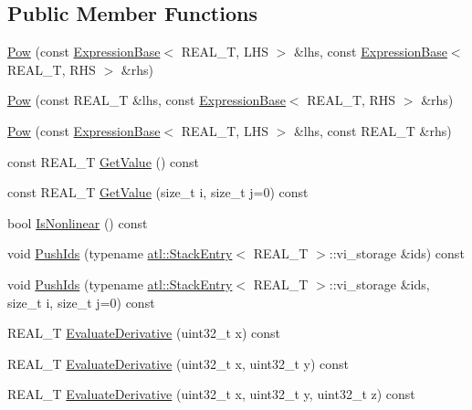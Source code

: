 \subsection*{Public Member Functions}
\begin{DoxyCompactItemize}
\item 
\hyperlink{structatl_1_1_pow_afb3e80bbc1bbeb76ccd888329272662a}{Pow} (const \hyperlink{structatl_1_1_expression_base}{Expression\+Base}$<$ R\+E\+A\+L\+\_\+\+T, L\+H\+S $>$ \&lhs, const \hyperlink{structatl_1_1_expression_base}{Expression\+Base}$<$ R\+E\+A\+L\+\_\+\+T, R\+H\+S $>$ \&rhs)
\item 
\hyperlink{structatl_1_1_pow_ae955961ba2a3ca77c7b4270ac16de12c}{Pow} (const R\+E\+A\+L\+\_\+\+T \&lhs, const \hyperlink{structatl_1_1_expression_base}{Expression\+Base}$<$ R\+E\+A\+L\+\_\+\+T, R\+H\+S $>$ \&rhs)
\item 
\hyperlink{structatl_1_1_pow_ae463f403a238b2cf4343ae40ddd97da7}{Pow} (const \hyperlink{structatl_1_1_expression_base}{Expression\+Base}$<$ R\+E\+A\+L\+\_\+\+T, L\+H\+S $>$ \&lhs, const R\+E\+A\+L\+\_\+\+T \&rhs)
\item 
const R\+E\+A\+L\+\_\+\+T \hyperlink{structatl_1_1_pow_a7239d2c29b75f2cfac4a898c07bebdea}{Get\+Value} () const 
\item 
const R\+E\+A\+L\+\_\+\+T \hyperlink{structatl_1_1_pow_a40ce8705e527d1781ec0113922adbb8a}{Get\+Value} (size\+\_\+t i, size\+\_\+t j=0) const 
\item 
bool \hyperlink{structatl_1_1_pow_a0cc1139fdf06fc5022739df45ff02c07}{Is\+Nonlinear} () const 
\item 
void \hyperlink{structatl_1_1_pow_a57c5b681bfbdc13658d6ad8a4d58b6cd}{Push\+Ids} (typename \hyperlink{structatl_1_1_stack_entry}{atl\+::\+Stack\+Entry}$<$ R\+E\+A\+L\+\_\+\+T $>$\+::vi\+\_\+storage \&ids) const 
\item 
void \hyperlink{structatl_1_1_pow_ab5fa97cfa79b08f23a94b912bcb2178f}{Push\+Ids} (typename \hyperlink{structatl_1_1_stack_entry}{atl\+::\+Stack\+Entry}$<$ R\+E\+A\+L\+\_\+\+T $>$\+::vi\+\_\+storage \&ids, size\+\_\+t i, size\+\_\+t j=0) const 
\item 
R\+E\+A\+L\+\_\+\+T \hyperlink{structatl_1_1_pow_a9cb128cf177456cdd44d98146059545a}{Evaluate\+Derivative} (uint32\+\_\+t x) const 
\item 
R\+E\+A\+L\+\_\+\+T \hyperlink{structatl_1_1_pow_a9e9fddff89f3d2f3c134cb318c51d635}{Evaluate\+Derivative} (uint32\+\_\+t x, uint32\+\_\+t y) const 
\item 
R\+E\+A\+L\+\_\+\+T \hyperlink{structatl_1_1_pow_a2035cc8133459198476f2d082e9759ac}{Evaluate\+Derivative} (uint32\+\_\+t x, uint32\+\_\+t y, uint32\+\_\+t z) const 

\end{DoxyCompactItemize}
